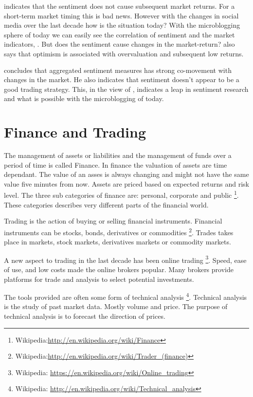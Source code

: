 \cite[p3]{Brown20041} indicates that the sentiment does not cause subsequent
market returns. For a short-term market timing this is bad news. However
with the changes in social media over the last decade how is the situation
today? With the microblogging sphere of today we can easily see the
correlation of sentiment and the market indicators,
\cite[]{annikajubbega11:twitter_driver_stock_price}. But
does the sentiment cause changes in the market-return?
\cite[p3]{Brown20041} also says that optimism is associated with overvaluation
and subsequent low returns.

\cite[p]{Brown20041} concludes that aggregated sentiment measures has strong
co-movement with changes in the market. He also indicates that sentiment
doesn't appear to be a good trading strategy. This, in the view of
\cite[]{Zhang201155}, indicates a leap in sentiment research and what is possible
with the microblogging of today.

\section{Finance and Trading}\label{previous_work:finance}

The management of assets or liabilities and the management of funds over a
period of time is called Finance. In finance the valuation of assets are time
dependant. The value of an asses is always changing and might not have the same
value five minutes from now. Assets are priced based on expected returns and
risk level. The three sub categories of finance are: personal, corporate and
public \footnote{Wikipedia:\url{http://en.wikipedia.org/wiki/Finance}}. These
categories describes very different parts of the financial world.  

Trading is the action of buying or selling financial instruments.
Financial instruments can be stocks, bonds, derivatives or commodities 
\footnote{Wikipedia:\url{http://en.wikipedia.org/wiki/Trader_(finance)}}.
Trades takes place in markets, stock markets, derivatives markets or commodity
markets.

A new aspect to trading in the last decade has been online trading
\footnote{Wikipedia: \url{https://en.wikipedia.org/wiki/Online_trading}}.
Speed, ease of use, and low costs made the online brokers popular. Many brokers
provide platforms for trade and analysis to select potential investments.  

The tools provided are often some form of technical analysis \footnote{Wikipedia:
\url{http://en.wikipedia.org/wiki/Technical_analysis}}. Technical analysis is
the study of past market data. Mostly volume and price. The purpose of technical
analysis is to forecast the direction of prices.  

